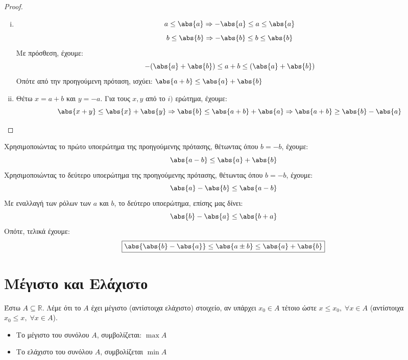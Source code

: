 \documentclass[main.tex]{subfiles}
\begin{document}
    \begin{proof}
    \item {}
        \begin{enumerate}[i)]
            \item \[ a \leq \abs{a} \Rightarrow - \abs{a} \leq a \leq \abs{a}
        \] 
        \[
            b \leq \abs{b} \Rightarrow - \abs{b} \leq b \leq \abs{b} 
         \] 
         Με πρόσθεση, έχουμε: 
         \[
             - (\abs{a} + \abs{b} ) \leq a + b \leq ( \abs{a} + \abs{b}) 
          \] 
Οπότε από την προηγούμενη πρόταση, ισχύει:
$ \abs{a+b} \leq \abs{a} + \abs{b} $
\item Θέτω $ x = a+b $ και $ y = -a $. Για τους $ x,y $ από το $ i) $ 
    ερώτημα, έχουμε:
    \[
        \abs{x+y} \leq \abs{x} + \abs{y} \Rightarrow \abs{b} \leq 
        \abs{a+b} + \abs{a} \Rightarrow \abs{a+b} \geq \abs{b} - \abs{a}
     \] 
\end{enumerate} 
\end{proof} 

\begin{rem}
    Χρησιμοποιώντας το πρώτο υποερώτημα της προηγούμενης πρότασης, θέτωντας
    όπου $ b = -b $, έχουμε:
    \[
        \abs{a-b} \leq \abs{a} + \abs{b} 
     \] 
    Χρησιμοποιώντας το δεύτερο υποερώτημα της προηγούμενης πρότασης, θέτωντας
    όπου $ b = -b $, έχουμε:
\[
    \abs{a} - \abs{b} \leq \abs{a-b} 
 \]
 Με εναλλαγή των ρόλων των $ a $ και $ b $, το δεύτερο υποερώτημα, επίσης 
 μας δίνει:
 \[
     \abs{b} - \abs{a} \leq \abs{b+a} 
  \] 
Οπότε, τελικά έχουμε:
\[
    \boxed{\abs{\abs{b} - \abs{a}} \leq \abs{a \pm b} \leq \abs{a} + \abs{b}  }
 \]
 
\end{rem}

\section{Μέγιστο και Ελάχιστο}

\begin{dfn}
    Έστω $ A \subseteq \mathbb{R} $. Λέμε ότι το $A$ έχει μέγιστο 
    (αντίστοιχα ελάχιστο) στοιχείο, αν υπάρχει $ x_{0} \in A $ τέτοιο 
    ώστε $ x \leq x_{0}, \; \forall x \in A $ (αντίστοιχα $ x_{0} \leq 
    x, \; \forall x \in A$).
\end{dfn}

\begin{rem}
\item {}
    \begin{itemize}
        \item Το μέγιστο του συνόλου $A$, συμβολίζεται: $ \max A $
        \item Το ελάχιστο του συνόλου $A$, συμβολίζεται $ \min A $
    \end{itemize}
\end{rem}
\end{document}
